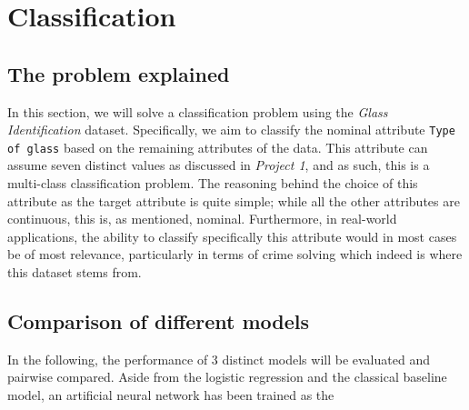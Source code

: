 \section{Classification}
\subsection{The problem explained}
In this section, we will solve a classification problem using the \textit{Glass Identification} dataset. Specifically, we aim to classify the nominal attribute \texttt{Type of glass} based on the remaining attributes of the data. This attribute can assume seven distinct values as discussed in \textit{Project 1}, and as such, this is a multi-class classification problem. The reasoning behind the choice of this attribute as the target attribute is quite simple; while all the other attributes are continuous, this is, as mentioned, nominal. Furthermore, in real-world applications, the ability to classify specifically this attribute would in most cases be of most relevance, particularly in terms of crime solving which indeed is where this dataset stems from.  

\subsection{Comparison of different models}
In the following, the performance of 3 distinct models will be evaluated and pairwise compared. Aside from the logistic regression and the classical baseline model, an artificial neural network has been trained as the 